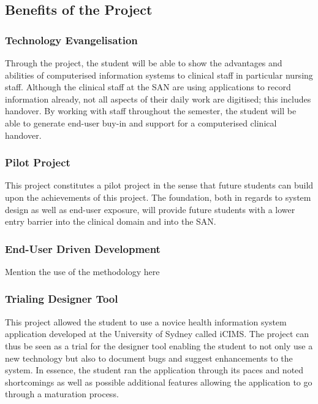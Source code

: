 \subsection{Benefits of the Project}
\subsubsection{Technology Evangelisation}
Through the project, the student will be able to show the advantages and abilities of computerised information systems to clinical staff in particular nursing staff. Although the clinical staff at the SAN are using applications to record information already, not all aspects of their daily work are digitised; this includes handover. By working with staff throughout the semester, the student will be able to generate end-user buy-in and support for a computerised clinical handover.

\newpage
\subsubsection{Pilot Project}
This project constitutes a pilot project in the sense that future students can build upon the achievements of this project. The foundation, both in regards to system design as well as end-user exposure, will provide future students with a lower entry barrier into the clinical domain and into the SAN.

\subsubsection{End-User Driven Development}

Mention the use of the methodology here

\subsubsection{Trialing Designer Tool}
This project allowed the student to use a novice health information system application developed at the University of Sydney called \gls{iCIMS}. The project can thus be seen as a trial for the designer tool enabling the student to not only use a new technology but also to document bugs and suggest enhancements to the system. In essence, the student ran the application through its paces and noted shortcomings as well as possible additional features allowing the application to go through a maturation process. 